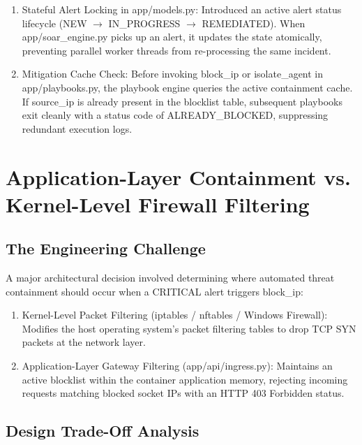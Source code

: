 \begin{enumerate}
  \item Stateful Alert Locking in app/models.py: Introduced an active alert status lifecycle (NEW $\rightarrow$ IN\_PROGRESS $\rightarrow$ REMEDIATED). When app/soar\_engine.py picks up an alert, it updates the state atomically, preventing parallel worker threads from re-processing the same incident.
  \item Mitigation Cache Check: Before invoking block\_ip or isolate\_agent in app/playbooks.py, the playbook engine queries the active containment cache. If source\_ip is already present in the blocklist table, subsequent playbooks exit cleanly with a status code of ALREADY\_BLOCKED, suppressing redundant execution logs.
\end{enumerate}

\section{Application-Layer Containment vs. Kernel-Level Firewall Filtering}

\subsection{The Engineering Challenge}

A major architectural decision involved determining where automated threat containment should occur when a CRITICAL alert triggers block\_ip:

\begin{enumerate}
  \item Kernel-Level Packet Filtering (iptables / nftables / Windows Firewall): Modifies the host operating system's packet filtering tables to drop TCP SYN packets at the network layer.
  \item Application-Layer Gateway Filtering (app/api/ingress.py): Maintains an active blocklist within the container application memory, rejecting incoming requests matching blocked socket IPs with an HTTP 403 Forbidden status.
\end{enumerate}

\subsection{Design Trade-Off Analysis}

